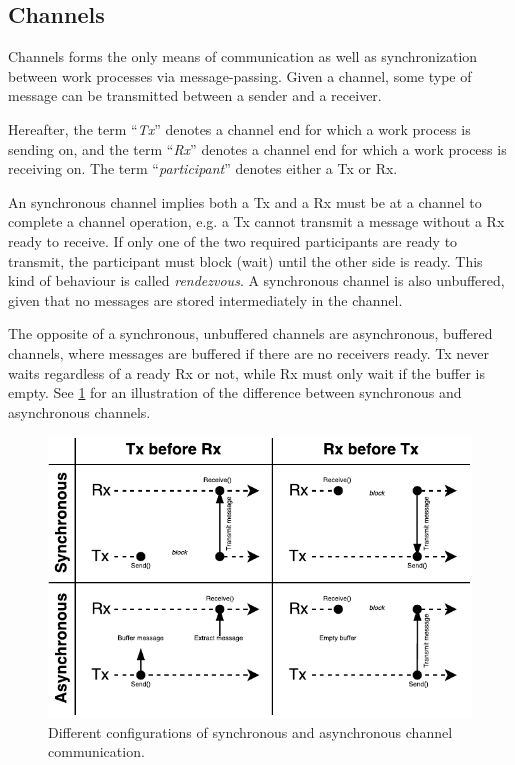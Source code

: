 \subsection{Channels}


Channels forms the only means of communication as well as synchronization between work processes via message\hyp{}passing. Given a channel, some type of message can be transmitted between a sender and a receiver.

Hereafter, the term ``\textit{Tx}'' denotes a channel end for which a work process is sending on, and the term ``\textit{Rx}'' denotes a channel end for which a work process is receiving on. The term ``\textit{participant}'' denotes either a Tx or Rx.

An synchronous channel implies both a Tx and a Rx must be at a channel to complete a channel operation, e.g. a Tx cannot transmit a message without a Rx ready to receive. If only one of the two required participants are ready to transmit, the participant must block (wait) until the other side is ready. This kind of behaviour is called \textit{rendezvous}. A synchronous channel is also unbuffered, given that no messages are stored intermediately in the channel.

The opposite of a synchronous, unbuffered channels are asynchronous, buffered channels, where messages are buffered if there are no receivers ready. Tx never waits regardless of a ready Rx or not, while Rx must only wait if the buffer is empty. See \cref{fig:channel_sync_async} for an illustration of the difference between synchronous and asynchronous channels.

\begin{figure}[h!]
    \centering
    \includegraphics[width=1\linewidth]{fig/channel_sync_async}
    \caption{Different configurations of synchronous and asynchronous channel communication.}
    \label{fig:channel_sync_async}
\end{figure}

